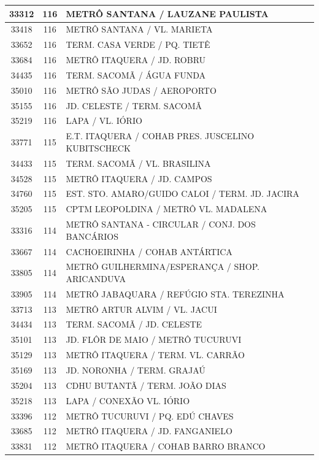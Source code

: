 \documentclass[
	12pt,				%
	oneside,			%
	a4paper,			%
	english,			%
	brazil				%
	]{abntex2ppgsi}
\begin{document}
{{\begin{apendicesenv}
\begin{longtable}{c|c|p{7cm}}
 \hline 
33312 &	116 &	METRÔ SANTANA / LAUZANE PAULISTA \\ 
 \hline 
33418 &	116 &	METRÔ SANTANA / VL. MARIETA \\ 
 \hline 
33652 &	116 &	TERM. CASA VERDE / PQ. TIETÊ \\ 
 \hline 
33684 &	116 &	METRÔ ITAQUERA / JD. ROBRU \\ 
 \hline 
34435 &	116 &	TERM. SACOMÃ / ÁGUA FUNDA \\ 
 \hline 
35010 &	116 &	METRÔ SÃO JUDAS / AEROPORTO \\ 
 \hline 
35155 &	116 &	JD. CELESTE / TERM. SACOMÃ \\ 
 \hline 
35219 &	116 &	LAPA / VL. IÓRIO \\ 
 \hline 
33771 &	115 &	E.T. ITAQUERA / COHAB PRES. JUSCELINO KUBITSCHECK \\ 
 \hline 
34433 &	115 &	TERM. SACOMÃ / VL. BRASILINA \\ 
 \hline 
34528 &	115 &	METRÔ ITAQUERA / JD. CAMPOS \\ 
 \hline 
34760 &	115 &	EST. STO. AMARO/GUIDO CALOI / TERM. JD. JACIRA \\ 
 \hline 
35205 &	115 &	CPTM LEOPOLDINA / METRÔ VL. MADALENA \\ 
 \hline 
33316 &	114 &	METRÔ SANTANA - CIRCULAR / CONJ. DOS BANCÁRIOS \\ 
 \hline 
33667 &	114 &	CACHOEIRINHA / COHAB ANTÁRTICA \\ 
 \hline 
33805 &	114 &	METRÔ GUILHERMINA/ESPERANÇA / SHOP. ARICANDUVA \\ 
 \hline 
33905 &	114 &	METRÔ JABAQUARA / REFÚGIO STA. TEREZINHA \\ 
 \hline 
33713 &	113 &	METRÔ ARTUR ALVIM / VL. JACUI \\ 
 \hline 
34434 &	113 &	TERM. SACOMÃ / JD. CELESTE \\ 
 \hline 
35101 &	113 &	JD. FLÔR DE MAIO / METRÔ TUCURUVI \\ 
 \hline 
35129 &	113 &	METRÔ ITAQUERA / TERM. VL. CARRÃO \\ 
 \hline 
35169 &	113 &	JD. NORONHA / TERM. GRAJAÚ \\ 
 \hline 
35204 &	113 &	CDHU BUTANTÃ / TERM. JOÃO DIAS \\ 
 \hline 
35218 &	113 &	LAPA / CONEXÃO VL. IÓRIO \\ 
 \hline 
33396 &	112 &	METRÔ TUCURUVI / PQ. EDÚ CHAVES \\ 
 \hline 
33685 &	112 &	METRÔ ITAQUERA / JD. FANGANIELO \\ 
 \hline 
33831 &	112 &	METRÔ ITAQUERA / COHAB BARRO BRANCO \\ 

\end{longtable}
\end{apendicesenv}}}
\end{document}
